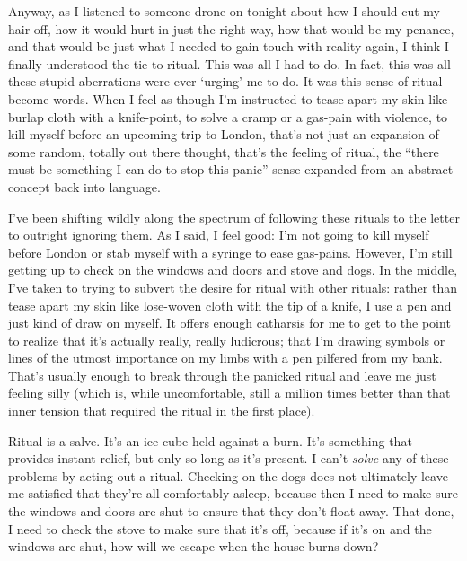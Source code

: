Anyway, as I listened to someone drone on tonight about how I should cut my hair off, how it would hurt in just the right way, how that would be my penance, and that would be just what I needed to gain touch with reality again, I think I finally understood the tie to ritual. This was all I had to do. In fact, this was all these stupid aberrations were ever `urging' me to do. It was this sense of ritual become words. When I feel as though I'm instructed to tease apart my skin like burlap cloth with a knife-point, to solve a cramp or a gas-pain with violence, to kill myself before an upcoming trip to London, that's not just an expansion of some random, totally out there thought, that's the feeling of ritual, the ``there must be something I can do to stop this panic'' sense expanded from an abstract concept back into language.

I've been shifting wildly along the spectrum of following these rituals to the letter to outright ignoring them. As I said, I feel good: I'm not going to kill myself before London or stab myself with a syringe to ease gas-pains. However, I'm still getting up to check on the windows and doors and stove and dogs. In the middle, I've taken to trying to subvert the desire for ritual with other rituals: rather than tease apart my skin like lose-woven cloth with the tip of a knife, I use a pen and just kind of draw on myself. It offers enough catharsis for me to get to the point to realize that it's actually really, really ludicrous; that I'm drawing symbols or lines of the utmost importance on my limbs with a pen pilfered from my bank. That's usually enough to break through the panicked ritual and leave me just feeling silly (which is, while uncomfortable, still a million times better than that inner tension that required the ritual in the first place).

Ritual is a salve. It's an ice cube held against a burn. It's something that provides instant relief, but only so long as it's present. I can't \emph{solve} any of these problems by acting out a ritual. Checking on the dogs does not ultimately leave me satisfied that they're all comfortably asleep, because then I need to make sure the windows and doors are shut to ensure that they don't float away. That done, I need to check the stove to make sure that it's off, because if it's on and the windows are shut, how will we escape when the house burns down?

